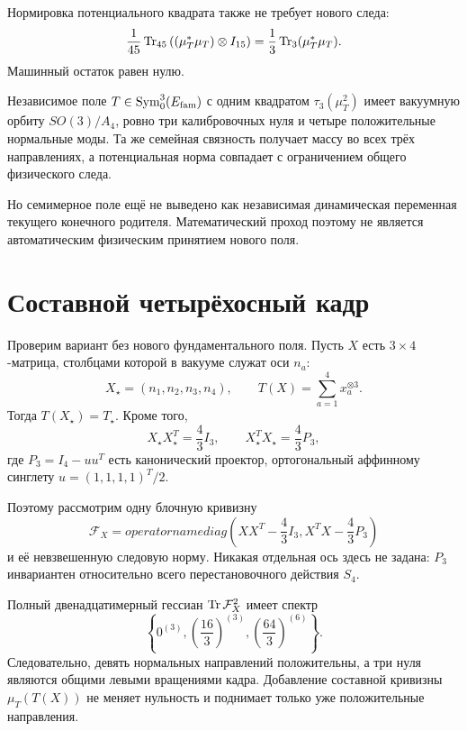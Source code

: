 Нормировка потенциального квадрата также не требует нового следа:
\begin{equation}
 \frac1{45}\operatorname{Tr}_{45}
 \left((\mu_T^*\mu_T)\otimes I_{15}\right)
 =\frac13\operatorname{Tr}_3(\mu_T^*\mu_T).
\end{equation}
Машинный остаток равен нулю.

\begin{theorem}
Независимое поле $T\in\operatorname{Sym}^3_0(E_{\rm fam})$ с одним
квадратом $\tau_3(\mu_T^2)$ имеет вакуумную орбиту $SO(3)/A_4$, ровно три
калибровочных нуля и четыре положительные нормальные моды. Та же семейная
связность получает массу во всех трёх направлениях, а потенциальная норма
совпадает с ограничением общего физического следа.
\end{theorem}

Но семимерное поле ещё не выведено как независимая динамическая переменная
текущего конечного родителя. Математический проход поэтому не является
автоматическим физическим принятием нового поля.

\section{Составной четырёхосный кадр}

Проверим вариант без нового фундаментального поля. Пусть $X$ есть
$3\times4$-матрица, столбцами которой в вакууме служат оси $n_a$:
\begin{equation}
 X_\star=(n_1,n_2,n_3,n_4),
 \qquad
 T(X)=\sum_{a=1}^4x_a^{\otimes3}.
 \label{eq:v6-composite-tetrahedral-frame}
\end{equation}
Тогда $T(X_\star)=T_\star$. Кроме того,
\begin{equation}
 X_\star X_\star^T=\frac43I_3,
 \qquad
 X_\star^TX_\star=\frac43P_3,
\end{equation}
где $P_3=I_4-uu^T$ есть канонический проектор, ортогональный аффинному
синглету $u=(1,1,1,1)^T/2$.

Поэтому рассмотрим одну блочную кривизну
\begin{equation}
 \mathcal F_X=operatorname{diag}\left(
 XX^T-\frac43I_3,
 X^TX-\frac43P_3
 \right)
 \label{eq:v6-composite-frame-curvature}
\end{equation}
и её невзвешенную следовую норму. Никакая отдельная ось здесь не задана:
$P_3$ инвариантен относительно всего перестановочного действия $S_4$.

Полный двенадцатимерный гессиан $\operatorname{Tr}\mathcal F_X^2$ имеет спектр
\begin{equation}
 \left\{
 0^{(3)},
 \left(\frac{16}{3}\right)^{(3)},
 \left(\frac{64}{3}\right)^{(6)}
 \right\}.
 \label{eq:v6-composite-frame-hessian}
\end{equation}
Следовательно, девять нормальных направлений положительны, а три нуля
являются общими левыми вращениями кадра. Добавление составной кривизны
$\mu_T(T(X))$ не меняет нульность и поднимает только уже положительные
направления.

